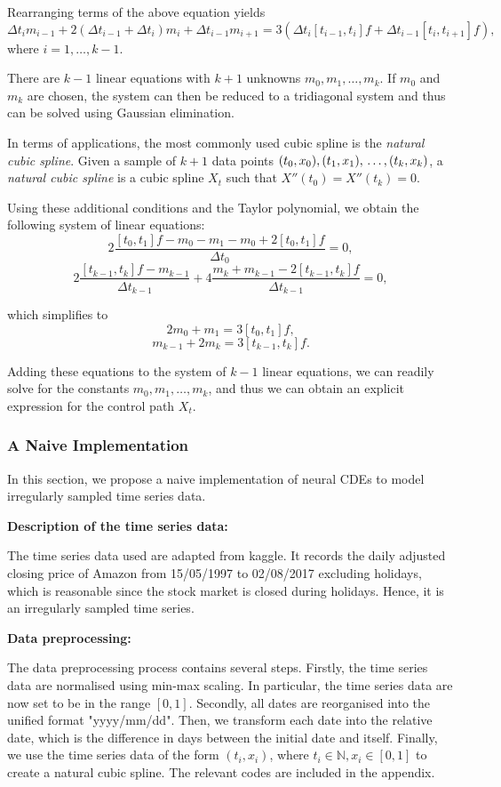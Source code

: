 \documentclass[a4paper,11pt,titlepage]{article}
\theoremstyle{definition}
\theoremstyle{plain}
\theoremstyle{remark}
\begin{document}
Rearranging terms of the above equation yields
$$\Delta t_im_{i-1}+2(\Delta t_{i-1}+\Delta t_i)m_i+\Delta t_{i-1}m_{i+1}=3(\Delta t_i[t_{i-1},t_i]f+\Delta t_{i-1}[t_i,t_{i+1}]f),$$
where $i=1,\dots,k-1$.

There are $k-1$ linear equations with $k+1$ unknowns $m_0,m_1,\dots,m_k$. If $m_0$ and $m_k$ are chosen, the system can then be reduced to a tridiagonal system and thus can be solved using Gaussian elimination.

In terms of applications, the most commonly used cubic spline is the \textit{natural cubic spline}.
 Given a sample of $k+1$ data points
$(t_0,x_0), (t_1,x_1), \\\dots, (t_k,x_k)$, a \textit{natural cubic spline} is a cubic spline $X_t$ such that $X''(t_0)=X''(t_k)=0$.

Using these additional conditions and the Taylor polynomial, we obtain the following system of linear equations:
$$2\frac{[t_0,t_1]f-m_0-m_1-m_0+2[t_0,t_1]f}{\Delta t_0}=0,$$
$$2\frac{[t_{k-1},t_k]f-m_{k-1}}{\Delta t_{k-1}}+4\frac{m_k+m_{k-1}-2[t_{k-1},t_k]f}{\Delta t_{k-1}}=0,$$

which simplifies to
$$2m_0+m_1=3[t_0,t_1]f,$$
$$m_{k-1}+2m_k=3[t_{k-1},t_k]f.$$

Adding these equations to the system of $k-1$ linear equations, we can readily solve for the constants $m_0,m_1,\dots,m_k$, and thus we can obtain an explicit expression for the control path $X_t$. \cite{Gautschi2012}

\subsubsection{A Naive Implementation}

In this section, we propose a naive implementation of neural CDEs to model irregularly sampled time series data.

\textbf{Description of the time series data:}

The time series data used are adapted from kaggle. It records the daily adjusted closing price of Amazon from 15/05/1997 to 02/08/2017 excluding holidays, which is reasonable since the stock market is closed during holidays. Hence, it is an irregularly sampled time series.

\textbf{Data preprocessing:}

The data preprocessing process contains several steps. Firstly, the time series data are normalised using min-max scaling. In particular, the time series data are now set to be in the range $[0,1]$. Secondly, all dates are reorganised into the unified format "yyyy/mm/dd". Then, we transform each date into the relative date, which is the difference in days between the initial date and itself. Finally, we use the time series data of the form $(t_i,x_i)$, where $t_i\in\mathbb{N}, x_i\in[0,1]$ to create a natural cubic spline. The relevant codes are included in the appendix.
\end{document}
